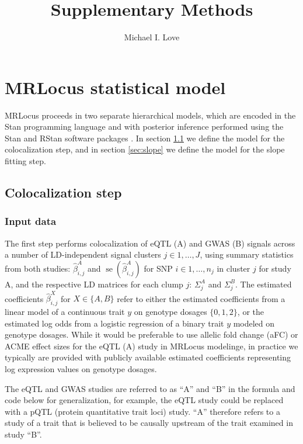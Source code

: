 \documentclass[11pt]{article}
\title{Supplementary Methods}
\author{Michael I. Love}
\DeclareMathOperator{\se}{\textrm{se}}
\begin{document}
\maketitle
\section{MRLocus statistical model}

MRLocus proceeds in two separate hierarchical models, which are
encoded in the Stan programming language and with posterior
inference performed using the Stan and RStan software packages
\citep{stan,rstan}. In section \ref{sec:coloc} we define the
model for the colocalization step, and in section \ref{sec:slope} we
define the model for the slope fitting step.

\subsection{Colocalization step} \label{sec:coloc}

\subsubsection{Input data}

The first step performs colocalization of eQTL (A) and GWAS (B)
signals across a number of LD-independent signal clusters
$j \in 1,\dots,J$, using summary statistics from both studies:
$\widehat{\beta}^A_{i,j}$ and $\se(\widehat{\beta}^A_{i,j})$
for SNP $i \in 1,\dots,n_j$ in cluster $j$ for study A,
and the respective LD matrices for each clump $j$:
$\Sigma_j^A$ and $\Sigma_j^B$.
The estimated coefficients $\widehat{\beta}^X_{i,j}$ for
$X \in \{A,B\}$ refer to either the estimated coefficients from a
linear model of a continuous trait $y$ on genotype dosages
$\{0,1,2\}$, or the estimated log odds from a logistic regression of a
binary trait $y$ modeled on genotype dosages. While it would be
preferable to use allelic fold change (aFC) \citep{aFC} or ACME effect sizes
\citep{ACME} for the eQTL (A) study in MRLocus modelinge, in practice
we typically are provided with publicly available estimated
coefficients representing log expression values on genotype dosages.

The eQTL and GWAS studies are referred to as ``A'' and ``B'' in the
formula and code below for generalization, for example, the eQTL study
could be replaced with a pQTL (protein quantitative trait loci)
study. ``A'' therefore refers to a study of a trait that is believed
to be causally upstream of the trait examined in study ``B''.
\end{document}
